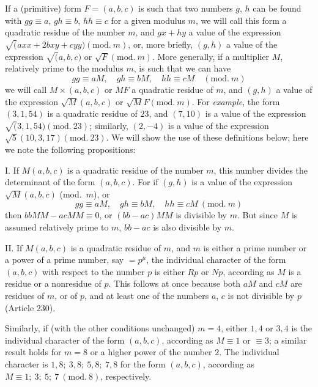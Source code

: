 If a (primitive) form $F=(a,b,c)$ is such that two numbers $g$, $h$ can be found with $gg\equiv a$, $gh\equiv b$, $hh\equiv c$ for a given modulus $m$, we will call this form a quadratic residue of the number $m$, and $gx+hy$ a value of the expression $\surd(axx+2bxy+cyy)(\mathrm{mod.}\ m)$, or, more briefly, $(g,h)$ a value of the expression $\surd(a,b,c)$ or $\surd F(\mathrm{mod.}\ m)$. More generally, if a multiplier $M$, relatively prime to the modulus $m$, is such that we can have
\[
gg\equiv aM,\quad gh\equiv bM,\quad hh\equiv cM\quad (\mathrm{mod.}\ m)
\]
we will call $M\times(a,b,c)$ or $MF$ a quadratic residue of $m$, and $(g,h)$ a value of the expression $\surd M(a,b,c)$ or $\surd MF(\mathrm{mod.}\ m)$. For \textit{example}, the form $(3,1,54)$ is a quadratic residue of $23$, and $(7,10)$ is a value of the expression $\surd(3,1,54)(\mathrm{mod.}\ 23)$; similarly, $(2,-4)$ is a value of the expression $\surd5(10,3,17)(\mathrm{mod.}\ 23)$. We will show the use of these definitions below; here we note the following propositions:

\par
{}
I. If $M(a,b,c)$ is a quadratic residue of the number $m$, this number divides the determinant of the form $(a,b,c)$. For if $(g,h)$ is a value of the expression $\surd M(a,b,c)$ (mod.\ $m$), or
\[
gg\equiv aM,\quad gh\equiv bM,\quad hh\equiv cM\ (\mathrm{mod.}\ m)
\]
then $bbMM-acMM\equiv0$, or $(bb-ac)MM$ is divisible by $m$. But since $M$ is assumed relatively prime to $m$, $bb-ac$ is also divisible by $m$.

II. If $M(a,b,c)$ is a quadratic residue of $m$, and $m$ is either a prime number or a power of a prime number, say $=p^\mu$, the individual character of the form $(a,b,c)$ with respect to the number $p$ is either $Rp$ or $Np$, according as $M$ is a residue or a nonresidue of $p$. This follows at once because both $aM$ and $cM$ are residues of $m$, or of $p$, and at least one of the numbers $a$, $c$ is not divisible by $p$ (Article 230).

Similarly, if (with the other conditions unchanged) $m=4$, either $1,4$ or $3,4$ is the individual character of the form $(a,b,c)$, according as $M\equiv1$ or $\equiv3$; a similar result holds for $m=8$ or a higher power of the number $2$. The individual character is $1,8;\ 3,8;\ 5,8;\ 7,8$ for the form $(a,b,c)$, according as $M\equiv1;\ 3;\ 5;\ 7\ (\mathrm{mod.}\ 8)$, respectively.

